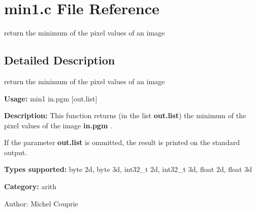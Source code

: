 \section{min1.c File Reference}
\label{min1_8c}
return the minimum of the pixel values of an image 



\subsection{Detailed Description}
return the minimum of the pixel values of an image 

{\bf Usage:} min1 in.pgm [out.list]

{\bf Description:} This function returns (in the list {\bf out.list}) the minimum of the pixel values of the image {\bf in.pgm} .

If the parameter {\bf out.list} is ommitted, the result is printed on the standard output.

{\bf Types supported:} byte 2d, byte 3d, int32\_\-t 2d, int32\_\-t 3d, float 2d, float 3d

{\bf Category:} arith

\begin{Desc}
\item[Author:]Michel Couprie \end{Desc}
